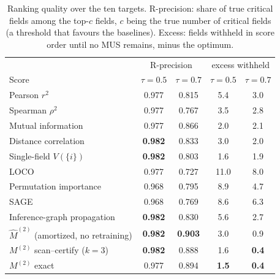 \begin{table}[!tp]
\centering\small
\caption{Ranking quality over the ten targets. R-precision: share of true critical fields among the top-$c$ fields, $c$ being
the true number of critical fields (a threshold that favours the baselines). Excess: fields withheld in score order until no
MUS remains, minus the optimum.}\label{tab:ranking}
\begin{tabular}{lcccc}
\toprule
 & \multicolumn{2}{c}{R-precision} & \multicolumn{2}{c}{excess withheld}\\
Score & $\tau=0.5$ & $\tau=0.7$ & $\tau=0.5$ & $\tau=0.7$\\
\midrule
Pearson $r^2$ & 0.977 & 0.815 & 5.4 & 3.0 \\
Spearman $\rho^2$ & 0.977 & 0.767 & 3.5 & 2.8 \\
Mutual information & 0.977 & 0.866 & 2.0 & 2.1 \\
Distance correlation & \textbf{0.982} & 0.833 & 3.0 & 2.0 \\
Single-field $V(\{i\})$ & \textbf{0.982} & 0.803 & 1.6 & 1.9 \\
LOCO & 0.977 & 0.727 & 11.0 & 8.0 \\
Permutation importance & 0.968 & 0.795 & 8.9 & 4.7 \\
SAGE & 0.968 & 0.769 & 8.6 & 6.3 \\
Inference-graph propagation & \textbf{0.982} & 0.830 & 5.6 & 2.7 \\
$\hat M^{(2)}$ (amortized, no retraining) & \textbf{0.982} & \textbf{0.903} & 3.0 & 0.9 \\
$M^{(2)}$ scan--certify ($k=3$) & \textbf{0.982} & 0.888 & 1.6 & \textbf{0.4} \\
$M^{(2)}$ exact & 0.977 & 0.894 & \textbf{1.5} & \textbf{0.4} \\
\bottomrule
\end{tabular}
\end{table}
